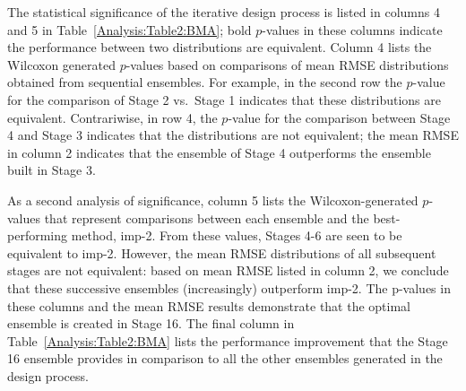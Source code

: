 \documentclass[journal=jpcbfk, manuscript=article]{achemso}
\newcommand{\+}[1]{\ensuremath{\mathbf{#1}}}
\newcommand{\rev}[1]{#1}
\begin{document}
The statistical significance of the iterative design process is listed in columns 4 and 5 in Table~\ref{Analysis:Table2:BMA}; bold $p$-values in these columns indicate the performance between two distributions are equivalent.
Column 4 lists the Wilcoxon generated $p$-values based on comparisons of mean RMSE distributions obtained from sequential ensembles.
For example, in the second row the $p$-value for the comparison of Stage 2 vs.~Stage 1 indicates that these distributions are equivalent.
Contrariwise, in row 4, the $p$-value for the comparison between Stage 4 and Stage 3 indicates that the distributions are not equivalent; the mean RMSE in column 2 indicates that the ensemble of Stage 4 outperforms the ensemble built in Stage 3.

As a second analysis of significance, column 5 lists the Wilcoxon-generated $p$-values that represent comparisons between each ensemble and the best-performing method, imp-2.
From these values, Stages 4-6 are seen to be equivalent to imp-2.
However, the mean RMSE \rev{distributions} of all subsequent stages are not equivalent: based on mean RMSE listed in column 2, we conclude that these successive ensembles (increasingly) outperform imp-2.
The p-values in these columns and the mean RMSE results demonstrate that the optimal ensemble is created in Stage 16.
The final column in Table~\ref{Analysis:Table2:BMA} lists the performance improvement that the Stage 16 ensemble provides in comparison to \rev{all the other ensembles generated in the design process}.
\end{document}
